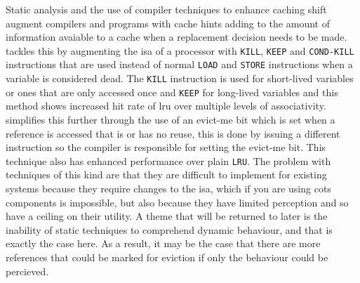 Static analysis and the use of compiler techniques to enhance caching shift augment compilers and programs with cache hints adding to the amount of information avaiable to a cache when a replacement decision needs to be made. \citet{jainSoftwareassistedCacheReplacement2001} tackles this by augmenting the \gls{isa} of a processor with \texttt{KILL}, \texttt{KEEP} and \texttt{COND-KILL} instructions that are used instead of normal \texttt{LOAD} and \texttt{STORE} instructions when a variable is considered dead. The \texttt{KILL} instruction is used for short-lived variables or ones that are only accessed once and \texttt{KEEP} for long-lived variables and this method shows increased hit rate of \gls{lru} over multiple levels of associativity. \citet{zhenlinwangUsingCompilerImprove2002} simplifies this further through the use of an evict-me bit which is set when a reference is accessed that is  or has no reuse, this is done by issuing a different instruction so the compiler is responsible for setting the evict-me bit. This technique also has enhanced performance over plain \texttt{LRU}. The problem with techniques of this kind are that they are difficult to implement for existing systems because they require changes to the \gls{isa}, which if you are using \gls{cots} components is impossible, but also because they have limited perception and so have a ceiling on their utility. A theme that will be returned to later is the inability of static techniques to comprehend dynamic behaviour, and that is exactly the case here. As a result, it may be the case that there are more references that could be marked for eviction if only the behaviour could be percieved. 

